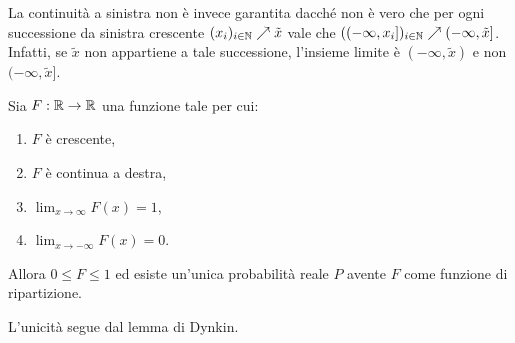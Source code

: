 \begin{multicols*}{2}
\begin{remark}
    La continuità a sinistra non è invece garantita dacché non è vero che per ogni successione da sinistra crescente
    $(x_i)_{i \in \mathbb{N}} \nearrow \tilde{x}$
    vale che $((-\infty, x_i])_{i \in \mathbb{N}} \nearrow (-\infty, \tilde{x}]$. Infatti, se $\tilde{x}$ non appartiene a tale
    successione, l'insieme limite è $(-\infty, \tilde{x})$ e non $(-\infty, \tilde{x}]$.
\end{remark}

\begin{proposition}
    Sia $F : \mathbb{R} \to \mathbb{R}$ una funzione tale per cui:
    \begin{enumerate}[(i.)]
        \item $F$ è crescente,
        \item $F$ è continua a destra,
        \item $\lim_{x \to \infty} F(x) = 1$,
        \item $\lim_{x \to -\infty} F(x) = 0$.
    \end{enumerate}
    Allora $0 \leq F \leq 1$ ed esiste un'unica probabilità reale $P$ avente
    $F$ come funzione di ripartizione. \smallskip


    L'unicità segue dal lemma di Dynkin.
\end{proposition}

\end{multicols*}